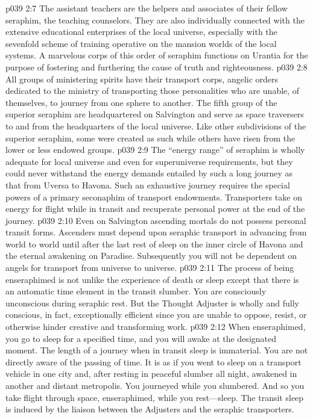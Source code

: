 \pc \vs p039 2:7 \bibnobreakspace {} The assistant teachers are the helpers and associates of their fellow seraphim, the teaching counselors. They are also individually connected with the extensive educational enterprises of the local universe, especially with the sevenfold scheme of training operative on the mansion worlds of the local systems. A marvelous corps of this order of seraphim functions on Urantia for the purpose of fostering and furthering the cause of truth and righteousness.
\pc \vs p039 2:8 \bibnobreakspace {} All groups of ministering spirits have their transport corps, angelic orders dedicated to the ministry of transporting those personalities who are unable, of themselves, to journey from one sphere to another. The fifth group of the superior seraphim are headquartered on Salvington and serve as space traversers to and from the headquarters of the local universe. Like other subdivisions of the superior seraphim, some were created as such while others have risen from the lower or less endowed groups.
\pc \vs p039 2:9 The “energy range” of seraphim is wholly adequate for local universe and even for superuniverse requirements, but they could never withstand the energy demands entailed by such a long journey as that from Uversa to Havona. Such an exhaustive journey requires the special powers of a primary seconaphim of transport endowments. Transporters take on energy for flight while in transit and recuperate personal power at the end of the journey.
\pc \vs p039 2:10 Even on Salvington ascending mortals do not possess personal transit forms. Ascenders must depend upon seraphic transport in advancing from world to world until after the last rest of sleep on the inner circle of Havona and the eternal awakening on Paradise. Subsequently you will not be dependent on angels for transport from universe to universe.
\vs p039 2:11 The process of being enseraphimed is not unlike the experience of death or sleep except that there is an automatic time element in the transit slumber. You are consciously unconscious during seraphic rest. But the Thought Adjuster is wholly and fully conscious, in fact, exceptionally efficient since you are unable to oppose, resist, or otherwise hinder creative and transforming work.
\vs p039 2:12 When enseraphimed, you go to sleep for a specified time, and you will awake at the designated moment. The length of a journey when in transit sleep is immaterial. You are not directly aware of the passing of time. It is as if you went to sleep on a transport vehicle in one city and, after resting in peaceful slumber all night, awakened in another and distant metropolis. You journeyed while you slumbered. And so you take flight through space, enseraphimed, while you rest---sleep. The transit sleep is induced by the liaison between the Adjusters and the seraphic transporters.
